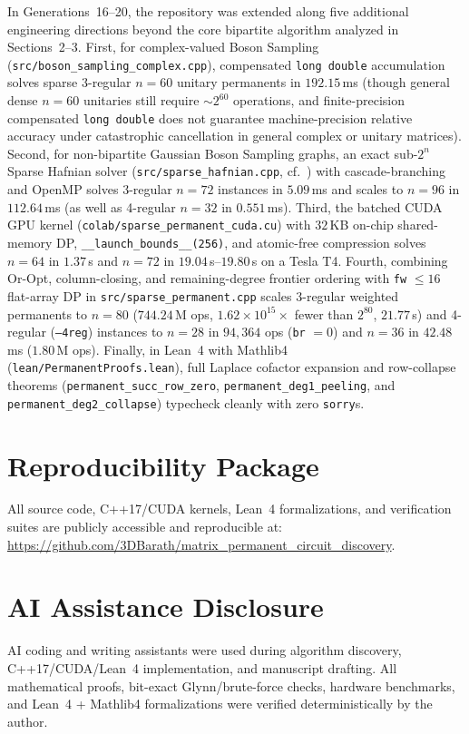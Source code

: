 \documentclass[11pt,a4paper]{article}
\theoremstyle{definition}
\begin{document}
In Generations~16--20, the repository was extended along five additional engineering directions beyond the core bipartite algorithm analyzed in Sections~2--3. First, for complex-valued Boson Sampling (\texttt{src/boson\_\-sampling\_\-complex.cpp}), compensated \texttt{long double} accumulation solves sparse 3-regular $n = 60$ unitary permanents in $192.15$\,ms (though general dense $n=60$ unitaries still require $\sim 2^{60}$ operations, and finite-precision compensated \texttt{long double} does not guarantee machine-precision relative accuracy under catastrophic cancellation in general complex or unitary matrices). Second, for non-bipartite Gaussian Boson Sampling graphs, an exact sub-$2^n$ Sparse Hafnian solver (\texttt{src/sparse\_\-hafnian.cpp}, cf.~\cite{bgq2019}) with cascade-branching and OpenMP solves 3-regular $n = 72$ instances in $5.09$\,ms and scales to $n = 96$ in $112.64$\,ms (as well as 4-regular $n = 32$ in $0.551$\,ms). Third, the batched CUDA GPU kernel (\texttt{colab/sparse\_\-permanent\_\-cuda.cu}) with $32$\,KB on-chip shared-memory DP, \texttt{\_\_launch\_\-bounds\_\_(256)}, and atomic-free compression solves $n = 64$ in $1.37$\,s and $n = 72$ in $19.04$\,s--$19.80$\,s on a Tesla T4. Fourth, combining Or-Opt, column-closing, and remaining-degree frontier ordering with \texttt{fw} $\le 16$ flat-array DP in \texttt{src/sparse\_\-permanent.cpp} scales 3-regular weighted permanents to $n = 80$ ($744.24$\,M ops, $1.62 \times 10^{15}\times$ fewer than $2^{80}$, $21.77$\,s) and 4-regular (\texttt{--4reg}) instances to $n = 28$ in $94{,}364$ ops (\texttt{br} $= 0$) and $n = 36$ in $42.48$\,ms ($1.80$\,M ops). Finally, in Lean~4 with Mathlib4 (\texttt{lean/Permanent\-Proofs.lean}), full Laplace cofactor expansion and row-collapse theorems (\texttt{permanent\_\-succ\_\-row\_\-zero}, \texttt{permanent\_\-deg1\_\-peeling}, and \texttt{permanent\_\-deg2\_\-collapse}) typecheck cleanly with zero \texttt{sorry}s.

\section*{Reproducibility Package}
All source code, C++17/CUDA kernels, Lean~4 formalizations, and verification suites are publicly accessible and reproducible at: \\
\url{https://github.com/3DBarath/matrix_permanent_circuit_discovery}.

\section*{AI Assistance Disclosure}
AI coding and writing assistants were used during algorithm discovery, C++17/CUDA/Lean~4 implementation, and manuscript drafting. All mathematical proofs, bit-exact Glynn/brute-force checks, hardware benchmarks, and Lean~4 + Mathlib4 formalizations were verified deterministically by the author.
\end{document}
